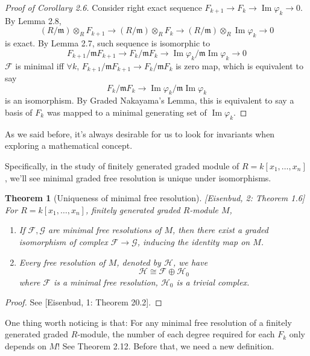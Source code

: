 \documentclass[11pt]{article}
\DeclareMathOperator{\ImOp}{Im} %
\newtheorem{theorem}{Theorem}[section]
\begin{document}
\begin{proof}[Proof of Corollary 2.6]
    Consider right exact sequence $F_{k+1} \to F_k \to \ImOp \varphi_k \to 0$.
    By Lemma 2.8,
    $$ (R/\mathfrak{m}) \otimes_R F_{k+1} \to (R/\mathfrak{m}) \otimes_R F_k \to (R/\mathfrak{m}) \otimes_R \ImOp \varphi_k \to 0 $$
    is exact. By Lemma 2.7, such sequence is isomorphic to
    $$ F_{k+1}/\mathfrak{m}F_{k+1} \to F_k/\mathfrak{m}F_k \to \ImOp \varphi_k / \mathfrak{m}\ImOp \varphi_k \to 0 $$
    $\mathcal{F}$ is minimal iff $\forall k$, $F_{k+1}/\mathfrak{m}F_{k+1} \to F_k/\mathfrak{m}F_k$ is zero map, which is equivalent to say
    $$ F_k/\mathfrak{m}F_k \to \ImOp \varphi_k / \mathfrak{m}\ImOp \varphi_k $$
    is an isomorphism. 
    By Graded Nakayama's Lemma, this is equivalent to say a basis of $F_k$ was mapped to a minimal generating set of $\ImOp \varphi_k$.
\end{proof}

As we said before, it's always desirable for us to look for invariants when exploring a mathematical concept.

Specifically, in the study of finitely generated graded module of $R = k[x_1, \dots, x_n]$, we'll see minimal graded free resolution is unique under isomorphisms.

\begin{theorem}[Uniqueness of minimal free resolution] [Eisenbud, 2: Theorem 1.6]
    For $R = k[x_1, \dots, x_n]$, finitely generated graded $R$-module $M$,
    \begin{enumerate}
        \item[i)] If $\mathcal{F}, \mathcal{G}$ are minimal free resolutions of $M$, then there exist a graded isomorphism of complex $\mathcal{F} \to \mathcal{G}$, inducing the identity map on $M$.
        \item[ii)] Every free resolution of $M$, denoted by $\mathcal{H}$, we have
        $$ \mathcal{H} \cong \mathcal{F} \oplus \mathcal{H}_0 $$
        where $\mathcal{F}$ is a minimal free resolution, $\mathcal{H}_0$ is a trivial complex.
    \end{enumerate}
\end{theorem}
\begin{proof}
    See [Eisenbud, 1: Theorem 20.2].
\end{proof}

One thing worth noticing is that: For any minimal free resolution of a finitely generated graded $R$-module, the number of each degree required for each $F_k$ only depends on $M$! See Theorem 2.12.
Before that, we need a new definition.
\end{document}
